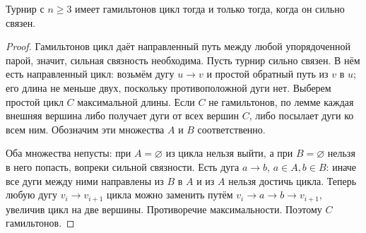 \begin{theorem}
Турнир с \(n\ge3\) имеет гамильтонов цикл тогда и только тогда,
когда он сильно связен.
\end{theorem}
\begin{proof}
Гамильтонов цикл даёт направленный путь между любой упорядоченной парой,
значит, сильная связность необходима.
Пусть турнир сильно связен. В нём есть направленный цикл:
возьмём дугу \(u\to v\) и простой обратный путь из \(v\) в \(u\);
его длина не меньше двух, поскольку противоположной дуги нет.
Выберем простой цикл \(C\) максимальной длины.
Если \(C\) не гамильтонов, по лемме каждая внешняя вершина либо
получает дуги от всех вершин \(C\), либо посылает дуги ко всем ним.
Обозначим эти множества \(A\) и \(B\) соответственно.

Оба множества непусты: при \(A=\varnothing\) из цикла нельзя выйти,
а при \(B=\varnothing\) нельзя в него попасть, вопреки сильной связности.
Есть дуга \(a\to b\), \(a\in A,b\in B\): иначе все дуги между ними
направлены из \(B\) в \(A\) и из \(A\) нельзя достичь цикла.
Теперь любую дугу \(v_i\to v_{i+1}\) цикла можно заменить путём
\(v_i\to a\to b\to v_{i+1}\), увеличив цикл на две вершины.
Противоречие максимальности. Поэтому \(C\) гамильтонов.
\end{proof}


